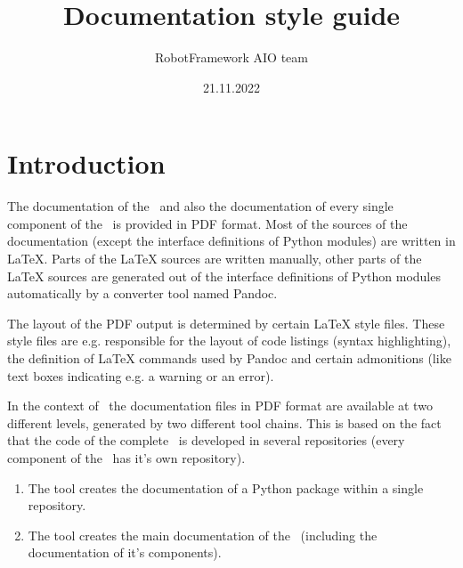 \documentclass[a4paper,10pt]{report}
\author{RobotFramework AIO team}
\title{Documentation style guide}
\date{21.11.2022}
\begin{document}
\hypersetup{pageanchor=false}

\maketitle

\clearpage
{}
\tableofcontents

\clearpage
{}

\hypersetup{pageanchor=true}


\chapter{Introduction}

The documentation of the \rfw\ and also the documentation of every single component of the \rfw\ is provided in PDF format.
Most of the sources of the documentation (except the interface definitions of Python modules) are written in LaTeX.
Parts of the LaTeX sources are written manually, other parts of the LaTeX sources are generated out of the interface definitions of Python modules
automatically by a converter tool named Pandoc.

The layout of the PDF output is determined by certain LaTeX style files. These style files are e.g. responsible for the layout of code listings (syntax highlighting),
the definition of LaTeX commands used by Pandoc and certain admonitions (like text boxes indicating e.g. a warning or an error).

In the context of \rfw\ the documentation files in PDF format are available at two different levels, generated by two different tool chains. This is based on the
fact that the code of the complete \rfw\ is developed in several repositories (every component of the \rfw\ has it's own repository).

\begin{enumerate}

   \item The tool  creates the documentation of a Python package within a single repository.

   \item The tool  creates the main documentation of the \rfw\ (including the documentation of it's components).

\end{enumerate}
\end{document}
